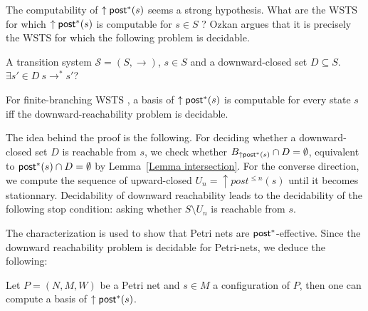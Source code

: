 \iffalse
\alain{definir downward reachability problem.....
downward-closed problem given a state $s$ of a WSTS
with strong upward compatibility 
and a decidable downward-closed set $D$, it can be decided whether $\exists s' \in D ~ s \to^* s'$. }
\fi


The computability of $\uparrow \textsf{post}^*(s)$ seems a strong hypothesis. What are the WSTS for which $\uparrow \textsf{post}^*(s)$ is computable for $s \in S$ ?
Ozkan \cite{DBLP:conf/gg/Ozkan22} argues that it is precisely the WSTS for which the following problem is decidable.

{A transition system $\mathscr{S}=(S,\rightarrow)$, $s \in S$ and a downward-closed set $D
\subseteq S$.}
{$\exists s' \in D ~ s \to^* s'$? \newline}



\begin{proposition}\label{post*}
For finite-branching WSTS%
, a basis of $\uparrow \textsf{post}^*(s)$ is computable for every state $s$ iff the downward-reachability problem is decidable.
\end{proposition}

The idea behind the proof is the following. For deciding whether a downward-closed set $D$ is reachable from $s$, we check whether
$B_{\uparrow \textsf{post}^*(s)} \cap D = \emptyset$, equivalent to $\textsf{post}^*(s)\cap D = \emptyset$ by
Lemma~\ref{Lemma intersection}. For the converse direction, we compute the sequence of upward-closed
$U_n = \uparrow post^{\leq n}(s)$ until it becomes stationnary. 
Decidability of downward reachability leads to the decidability of the following stop condition:
asking whether $S \setminus U_n$ is reachable from $s$.


The characterization is used to show that Petri nets are $\textsf{post}^*$-effective. Since the downward reachability problem is decidable for Petri-nets, we deduce the following:

\begin{proposition}
Let $P = (N,M,W)$ be a Petri net and $s \in M$ a configuration of $P$, then one can compute a basis of $\uparrow \textsf{post}^*(s)$.
\end{proposition}

